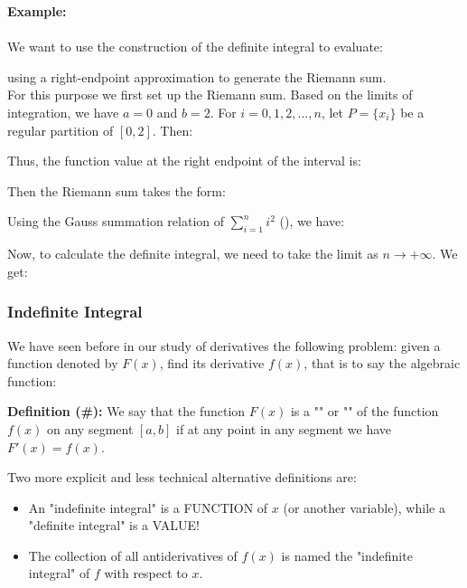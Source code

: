 	\begin{tcolorbox}[colframe=black,colback=white,sharp corners]
	\textbf{{\Large {}}Example:}\\\\
	We want to use the construction of the definite integral to evaluate:
	
	using a right-endpoint approximation to generate the Riemann sum.\\
	
	For this purpose we first set up the Riemann sum. Based on the limits of integration, we have $a=0$ and $b=2$. For $i=0,1,2,\ldots,n$, let $P=\{x_i\}$ be a regular partition of $[0,2]$. Then:
	
	Thus, the function value at the right endpoint of the interval is:
	
	Then the Riemann sum takes the form:
	
	Using the Gauss summation relation of $\displaystyle\sum_{i=1}^n i^2$ (), we have:
	
	Now, to calculate the definite integral, we need to take the limit as $n\rightarrow+\infty$. We get:
	 
	\end{tcolorbox}
	
	\subsubsection{Indefinite Integral}
	We have seen before in our study of derivatives the following problem: given a function denoted by $F(x)$, find its derivative $f(x)$, that is to say the algebraic function:
	
	\textbf{Definition (\#\mydef):} We say that the function $F (x)$ is a "" or "" of the function $f (x)$ on any segment $[a, b]$ if at any point in any segment we have $F'(x)=f(x)$.
	
	Two more explicit and less technical alternative definitions are: 
	\begin{itemize}
		\item An "indefinite integral" is a FUNCTION of $x$ (or another variable), while a "definite integral" is a VALUE!
		
		\item The collection of all antiderivatives of $f(x)$ is named the "indefinite integral" of $f$ with respect to $x$.
	\end{itemize}

